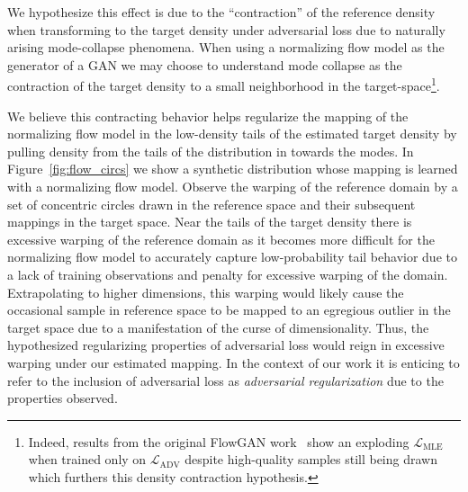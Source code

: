 We hypothesize this effect is due to the ``contraction'' of the reference density when transforming to the target
density under adversarial loss due to naturally arising mode-collapse phenomena.
When using a normalizing flow model as the generator of a GAN we may choose to understand mode collapse as the
contraction of the target density to a small neighborhood in the target-space\footnote{
    Indeed, results from the original FlowGAN work~\cite{flow_gan} show an exploding $\mathcal{L}_{\text{MLE}}$ when
    trained only on $\mathcal{L}_{\text{ADV}}$ despite high-quality samples still being drawn which furthers this
    density contraction hypothesis.
}.

We believe this contracting behavior helps regularize the mapping of the normalizing flow model in the low-density tails
of the estimated target density by pulling density from the tails of the distribution in towards the modes.
In Figure~\ref{fig:flow_circs} we show a synthetic distribution whose mapping is learned with a normalizing flow model.
Observe the warping of the reference domain by a set of concentric circles drawn in the reference space and their
subsequent mappings in the target space.
Near the tails of the target density there is excessive warping of the reference domain as it becomes more
difficult for the normalizing flow model to accurately capture low-probability tail behavior due to a lack of training
observations and penalty for excessive warping of the domain.
Extrapolating to higher dimensions, this warping would likely cause the occasional sample in reference space to be
mapped to an egregious outlier in the target space due to a manifestation of the curse of dimensionality.
Thus, the hypothesized regularizing properties of adversarial loss would reign in excessive warping under our
estimated mapping.
In the context of our work it is enticing to refer to the inclusion of adversarial loss as \textit{adversarial
regularization} due to the properties observed.

